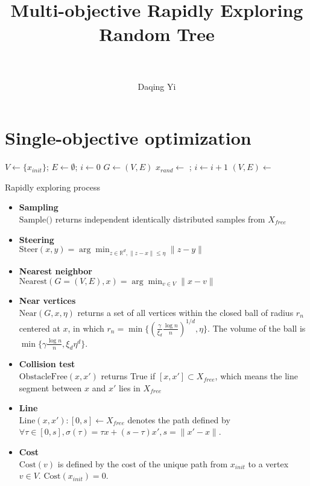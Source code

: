 \documentclass[paper=a4, fontsize=11pt]{scrartcl}
\title{
		\normalfont
		\horrule{0.5pt} \\[0.4cm]
		\huge Multi-objective Rapidly Exploring Random Tree \\
		\horrule{2pt} \\[0.5cm]
}
\author{
		\normalfont %
        Daqing Yi \\
}
\begin{document}
\maketitle

\section{Single-objective optimization}

\begin{algorithm}
\begin{algorithmic}[1]
\State $ V \leftarrow \{ x_{init} \} $; $ E \leftarrow \emptyset $; $ i \leftarrow 0 $
\State $ G \leftarrow (V, E) $
\State $ x_{rand} \leftarrow $  ; $ i \leftarrow i + 1 $
\State $ (V, E) \leftarrow $ 
\EndWhile
\end{algorithmic}
\label{alg:rapidly_exploring_process}
\caption{Rapidly exploring process}
\end{algorithm}

\begin{itemize}
\item \textbf{Sampling} \\
$ \mbox{Sample(}) $ returns independent identically distributed samples from $ X_{free} $
\item \textbf{Steering} \\
$ \mbox{Steer}(x,y) = \arg \min_{ z \in \mathbb{R}^{d}, \lVert z -x \rVert \leq \eta } \lVert z - y \rVert $
\item \textbf{Nearest neighbor} \\
$ \mbox{Nearest}(G = (V,E), x) = \arg \min_{v \in V} \lVert x - v \rVert $ 
\item \textbf{Near vertices} \\
$ \mbox{Near}(G, x, \eta) $ returns a set of all vertices within the closed ball of radius $ r_{n} $ centered at $ x $, in which $ r_{n} = \min \{ ( \frac{\gamma}{\xi_{d}} \frac{\log n}{n} )^{1/d}  , \eta \} $.
The volume of the ball is $ \min \{ \gamma \frac{\log n}{n} , \xi_{d} \eta^{d} \} $.
\item \textbf{Collision test} \\
$ \mbox{ObstacleFree}(x, x') $ returns True if $ [ x, x' ] \subset X_{free} $, which means the line segment between $ x $ and $ x' $ lies in $ X _{free} $
\item \textbf{Line} \\
$ \mbox{Line}(x, x') : [0, s] \leftarrow X_{free} $ denotes the path defined by $ \forall \tau \in [0, s], \sigma( \tau ) = \tau x + (s - \tau) x', s = \lVert x' -x \rVert $.
\item \textbf{Cost} \\
$ \mbox{Cost}( v ) $ is defined by the cost of the unique path from $ x_{init} $ to a vertex $ v \in V $.
$ \mbox{Cost}( x_{init} ) = 0 $.
\end{itemize}
\end{document}
